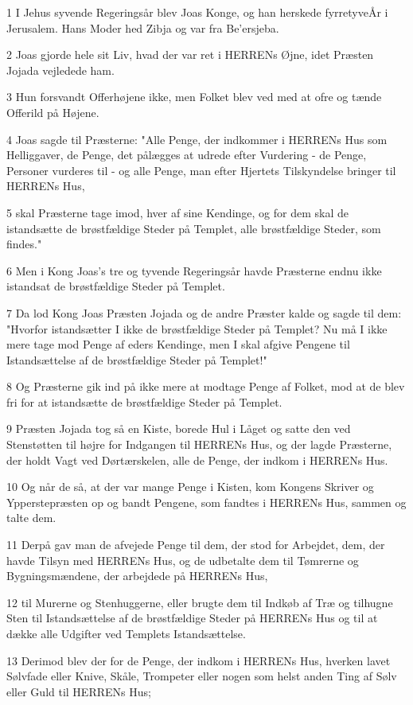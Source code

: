 \par 1 I Jehus syvende Regeringsår blev Joas Konge, og han herskede fyrretyveÅr i Jerusalem. Hans Moder hed Zibja og var fra Be'ersjeba.
\par 2 Joas gjorde hele sit Liv, hvad der var ret i HERRENs Øjne, idet Præsten Jojada vejledede ham.
\par 3 Hun forsvandt Offerhøjene ikke, men Folket blev ved med at ofre og tænde Offerild på Højene.
\par 4 Joas sagde til Præsterne: "Alle Penge, der indkommer i HERRENs Hus som Helliggaver, de Penge, det pålægges at udrede efter Vurdering - de Penge, Personer vurderes til - og alle Penge, man efter Hjertets Tilskyndelse bringer til HERRENs Hus,
\par 5 skal Præsterne tage imod, hver af sine Kendinge, og for dem skal de istandsætte de brøstfældige Steder på Templet, alle brøstfældige Steder, som findes."
\par 6 Men i Kong Joas's tre og tyvende Regeringsår havde Præsterne endnu ikke istandsat de brøstfældige Steder på Templet.
\par 7 Da lod Kong Joas Præsten Jojada og de andre Præster kalde og sagde til dem: "Hvorfor istandsætter I ikke de brøstfældige Steder på Templet? Nu må I ikke mere tage mod Penge af eders Kendinge, men I skal afgive Pengene til Istandsættelse af de brøstfældige Steder på Templet!"
\par 8 Og Præsterne gik ind på ikke mere at modtage Penge af Folket, mod at de blev fri for at istandsætte de brøstfældige Steder på Templet.
\par 9 Præsten Jojada tog så en Kiste, borede Hul i Låget og satte den ved Stenstøtten til højre for Indgangen til HERRENs Hus, og der lagde Præsterne, der holdt Vagt ved Dørtærskelen, alle de Penge, der indkom i HERRENs Hus.
\par 10 Og når de så, at der var mange Penge i Kisten, kom Kongens Skriver og Ypperstepræsten op og bandt Pengene, som fandtes i HERRENs Hus, sammen og talte dem.
\par 11 Derpå gav man de afvejede Penge til dem, der stod for Arbejdet, dem, der havde Tilsyn med HERRENs Hus, og de udbetalte dem til Tømrerne og Bygningsmændene, der arbejdede på HERRENs Hus,
\par 12 til Murerne og Stenhuggerne, eller brugte dem til Indkøb af Træ og tilhugne Sten til Istandsættelse af de brøstfældige Steder på HERRENs Hus og til at dække alle Udgifter ved Templets Istandsættelse.
\par 13 Derimod blev der for de Penge, der indkom i HERRENs Hus, hverken lavet Sølvfade eller Knive, Skåle, Trompeter eller nogen som helst anden Ting af Sølv eller Guld til HERRENs Hus;
